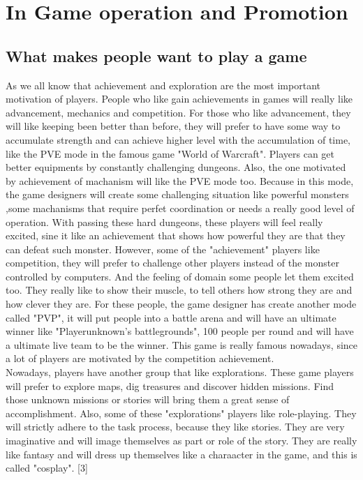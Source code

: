 \documentclass[12pt]{article}
\begin{document}
    \section{In Game operation and Promotion}
        \subsection{What makes people want to play a game}
            As we all know that achievement and exploration are the most important motivation of
            players. People who like gain achievements in games will really like advancement,
            mechanics and competition. For those who like advancement, they will like keeping been
            better than before, they will prefer to have some way to accumulate strength and can achieve
            higher level with the accumulation of time, like the PVE mode in the famous game "World of Warcraft".
            Players can get better equipments by constantly challenging dungeons. Also, the one
            motivated by achievement of machanism will like the PVE mode too. Because in this mode,
            the game designers will create some challenging situation like powerful monsters ,some
            machanisms that require perfet coordination or needs a really good level of operation.
            With passing these hard dungeons, these players will feel really excited, sine it like
            an achievement that shows how powerful they are that they can defeat such monster.
            However, some of the "achievement" players like competition, they will prefer to challenge
            other players instead of the monster controlled by computers.
            And the feeling of domain some people let them excited too. They really like to show their
            muscle, to tell others how strong they are and how clever they are. For these people, the
            game designer has create another mode called "PVP", it will put people into a battle arena
            and will have an ultimate winner like "Playerunknown's battlegrounds", 100 people per round and will have a ultimate
            live team to be the winner. This game is really famous nowadays, since a lot of players
            are motivated by the competition achievement.\\

            Nowadays, players have another group that like explorations. These game players will
            prefer to explore maps, dig treasures and discover hidden missions. Find those unknown
            missions or stories will bring them a great sense of accomplishment. Also, some of these
            "explorations" players like role-playing. They will strictly adhere to the task process,
            because they like stories. They are very imaginative and will image themselves as part
            or role of the story. They are really like fantasy and will dress up themselves like
            a charaacter in the game, and this is called "cosplay".
            [3]
\end{document}
